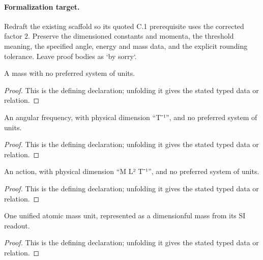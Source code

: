 \paragraph{Formalization target.}
Redraft the existing scaffold so its quoted C.1 prerequisite uses the corrected
factor \(2\).  Preserve the dimensioned constants and momenta, the threshold
meaning, the specified angle, energy and mass data, and the explicit rounding
tolerance.  Leave proof bodies as `by sorry`.

\begin{definition}[DimMass]
  \label{decl:physics:IPhO_2026_1_C_2:DimMass}
  A mass with no preferred system of units.
\end{definition}
\begin{proof}
  This is the defining declaration; unfolding it gives the stated typed data or relation.
\end{proof}

\begin{definition}[AngularFrequency]
  \label{decl:physics:IPhO_2026_1_C_2:AngularFrequency}
  An angular frequency, with physical dimension “T⁻¹”, and no preferred system of units.
\end{definition}
\begin{proof}
  This is the defining declaration; unfolding it gives the stated typed data or relation.
\end{proof}

\begin{definition}[DimAction]
  \label{decl:physics:IPhO_2026_1_C_2:DimAction}
  An action, with physical dimension “M L² T⁻¹”, and no preferred system of units.
\end{definition}
\begin{proof}
  This is the defining declaration; unfolding it gives the stated typed data or relation.
\end{proof}

\begin{definition}[atomicMassUnit]
  \label{decl:physics:IPhO_2026_1_C_2:atomicMassUnit}
  One unified atomic mass unit, represented as a dimensionful mass from its SI readout.
\end{definition}
\begin{proof}
  This is the defining declaration; unfolding it gives the stated typed data or relation.
\end{proof}

